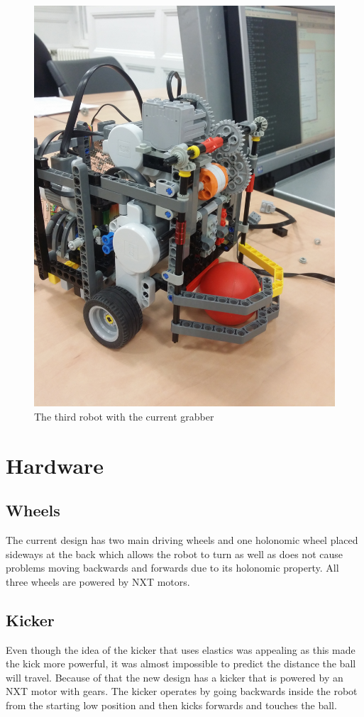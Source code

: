 \documentclass[12pt]{article}
\begin{document}
\begin{figure}
\begin{minipage}[b]{.48\textwidth}
		\includegraphics[scale=.065,angle=-90]{robot2.jpg}
		\caption{The third robot with the current grabber}
		\label{fig:robot2}
	\end{minipage}
\end{figure}


\section{Hardware}

\subsection{Wheels}
The current design has two main driving wheels and one holonomic wheel placed sideways at the back which allows the robot to turn as well as does not cause problems moving backwards and
forwards due to its holonomic property. All three wheels are powered by NXT motors.
\subsection{Kicker}
Even though the idea of the kicker that uses elastics was appealing as this made
the kick more powerful, it was almost impossible to predict the distance the
ball will travel. Because of that the new design has a
kicker that is powered by an NXT motor with gears. The kicker operates by going backwards inside the robot from the starting low position and then kicks
forwards and touches the ball.
\end{document}
